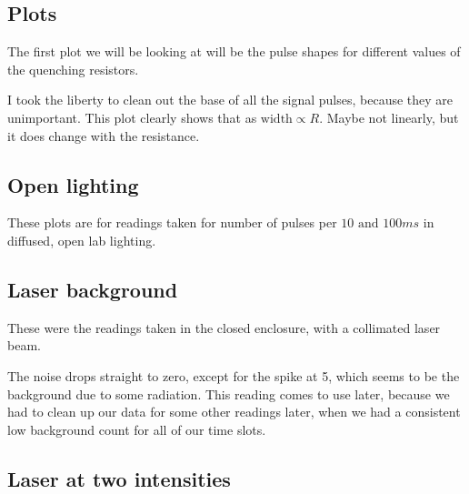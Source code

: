 \documentclass{double}
\begin{document}
\begin{multicols*}{2}
\section{Plots}
The first plot we will be looking at will be the pulse shapes for different values of the quenching resistors.
\begin{figure}[H]
	\centering
	\resizebox{0.8\columnwidth}{!}{%
		
	}
\end{figure}
I took the liberty to clean out the base of all the signal pulses, because they are unimportant. This plot clearly shows that as $\text{width} \propto R$. Maybe not linearly, but it does change with the resistance.
\label{plots}
\subsection{Open lighting}
These plots are for readings taken for number of pulses per $10 \text{ and } 100 \si{ms}$ in diffused, open lab lighting.
\begin{figure}[H]
	\centering
	\resizebox{0.8\columnwidth}{!}{%
	
}
\end{figure}
\begin{figure}[H]
	\centering
	\resizebox{0.8\columnwidth}{!}{%
		
	}
\end{figure}
\subsection{Laser background}
These were the readings taken in the closed enclosure, with a collimated laser beam. 
\begin{figure}[H]
	\centering
	\resizebox{0.8\columnwidth}{!}{%
		
	}
\end{figure}
The noise drops straight to zero, except for the spike at 5, which seems to be the background due to some radiation. This reading comes to use later, because we had to clean up our data for some other readings later, when we had a consistent low background count for all of our time slots.
\subsection{Laser at two intensities}
\begin{figure}[H]
	\centering
	\resizebox{0.8\columnwidth}{!}{%
		
	}
\end{figure}
\begin{figure}[H]
	\centering
	\resizebox{0.8\columnwidth}{!}{%
		
	}
\end{figure}
\begin{figure}[H]
	\centering
	\resizebox{0.8\columnwidth}{!}{%
		
	}
\end{figure}
\begin{figure}[H]
	\centering
	\resizebox{0.8\columnwidth}{!}{%
		
	}
\end{figure}

\end{multicols*}
\end{document}
